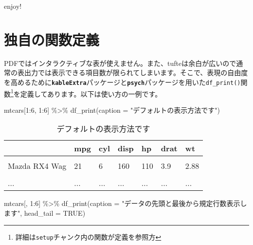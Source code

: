 \documentclass[
  12pt,
  a4paper,
  xelatex,
  ja=standard]{bxjsarticle}
\newenvironment{Shaded}{\begin{snugshade}}{\end{snugshade}}
\newcommand{\AttributeTok}[1]{\textcolor[rgb]{0.77,0.63,0.00}{#1}}
\newcommand{\ConstantTok}[1]{\textcolor[rgb]{0.00,0.00,0.00}{#1}}
\newcommand{\DecValTok}[1]{\textcolor[rgb]{0.00,0.00,0.81}{#1}}
\newcommand{\FunctionTok}[1]{\textcolor[rgb]{0.00,0.00,0.00}{#1}}
\newcommand{\NormalTok}[1]{#1}
\newcommand{\SpecialCharTok}[1]{\textcolor[rgb]{0.00,0.00,0.00}{#1}}
\newcommand{\StringTok}[1]{\textcolor[rgb]{0.31,0.60,0.02}{#1}}
\begin{document}
enjoy!

\newpage

\hypertarget{ux72ecux81eaux306eux95a2ux6570ux5b9aux7fa9}{%
\section{独自の関数定義}\label{ux72ecux81eaux306eux95a2ux6570ux5b9aux7fa9}}

PDFではインタラクティブな表が使えません。また、tufteは余白が広いので通常の表出力では表示できる項目数が限られてしまいます。そこで、表現の自由度を高めるために\textbf{\texttt{kableExtra}}パッケージと\textbf{\texttt{psych}}パッケージを用いた\texttt{df\_print()}関数\footnote{詳細は\texttt{setup}チャンク内の関数が定義を参照方}を定義してあります。以下は使い方の一例です。

\begin{Shaded}
\begin{Highlighting}[numbers=left,,]
\NormalTok{mtcars[}\DecValTok{1}\SpecialCharTok{:}\DecValTok{6}\NormalTok{, }\DecValTok{1}\SpecialCharTok{:}\DecValTok{6}\NormalTok{] }\SpecialCharTok{\%\textgreater{}\%} 
  \FunctionTok{df\_print}\NormalTok{(}\AttributeTok{caption =} \StringTok{"デフォルトの表示方法です"}\NormalTok{)}
\end{Highlighting}
\end{Shaded}

\begin{table}[H]

\caption{\label{tab:unnamed-chunk-1}デフォルトの表示方法です}
\centering
\begin{tabular}[t]{lllllll}
\toprule
  & mpg & cyl & disp & hp & drat & wt\\
\midrule
\cellcolor{gray!6}{Mazda RX4} & \cellcolor{gray!6}{21} & \cellcolor{gray!6}{6} & \cellcolor{gray!6}{160} & \cellcolor{gray!6}{110} & \cellcolor{gray!6}{3.9} & \cellcolor{gray!6}{2.62}\\
Mazda RX4 Wag & 21 & 6 & 160 & 110 & 3.9 & 2.88\\
\cellcolor{gray!6}{Datsun 710} & \cellcolor{gray!6}{22.8} & \cellcolor{gray!6}{4} & \cellcolor{gray!6}{108} & \cellcolor{gray!6}{93} & \cellcolor{gray!6}{3.85} & \cellcolor{gray!6}{2.32}\\
... & ... & ... & ... & ... & ... & ...\\
\bottomrule
\end{tabular}
\end{table}

\begin{Shaded}
\begin{Highlighting}[numbers=left,,]
\NormalTok{mtcars[, }\DecValTok{1}\SpecialCharTok{:}\DecValTok{6}\NormalTok{] }\SpecialCharTok{\%\textgreater{}\%} 
  \FunctionTok{df\_print}\NormalTok{(}\AttributeTok{caption =} \StringTok{"データの先頭と最後から規定行数表示します"}\NormalTok{,}
           \AttributeTok{head\_tail =} \ConstantTok{TRUE}\NormalTok{)}
\end{Highlighting}
\end{Shaded}
\end{document}

